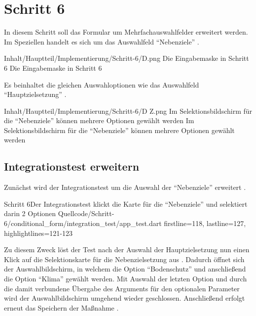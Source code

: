 \chapter{Schritt 6}
\label{chap:Schritt-6}

In diesem Schritt soll das Formular um Mehrfachauswahlfelder erweitert werden.
Im Speziellen handelt es sich um das Auswahlfeld \enquote{Nebenziele} \Abb{\ref{fig:Schritt4EingabemaskeD}}.
\begin{alexfigure}{Inhalt/Hauptteil/Implementierung/Schritt-6/D.png}
  {Die Eingabemaske in Schritt 6}
  {Die Eingabemaske in Schritt 6}

  \label{fig:Schritt4EingabemaskeD}

\end{alexfigure}


Es beinhaltet die gleichen Auswahloptionen wie das Auswahlfeld \enquote{Hauptzielsetzung} \Abb{\ref{fig:Schritt4EingabemaskeDZ}}.
\begin{alexfigure}{Inhalt/Hauptteil/Implementierung/Schritt-6/D Z.png}
  {Im Selektionsbildschirm für die \enquote{Nebenziele} können mehrere Optionen gewählt werden}
  {Im Selektionsbildschirm für die \enquote{Nebenziele} können mehrere Optionen gewählt werden}

  \label{fig:Schritt4EingabemaskeDZ}

\end{alexfigure}


\section{Integrationstest erweitern}

Zunächst wird der Integrationstest um die Auswahl der \enquote{Nebenziele} erweitert \Lst{\ref{lst:Schritt6tabSelectionCard}}.

\begin{alexlisting}{Schritt 6}{Der Integrationstest klickt die Karte für die \enquote{Nebenziele} und selektiert darin 2 Optionen}
  {Quellcode/Schritt-6/conditional_form/integration_test/app_test.dart}
  {firstline=118, lastline=127, highlightlines={121-123}}
  \label{lst:Schritt6tabSelectionCard}
\end{alexlisting}

Zu diesem Zweck löst der Test nach der Auswahl der Hauptzielsetzung  nun einen Klick auf die Selektionskarte für die Nebenzielsetzung aus .
Dadurch öffnet sich der Auswahlbildschirm,
in welchem die Option \enquote{Bodenschutz}  und anschließend die Option \enquote{Klima}  gewählt werden.
Mit Auswahl der letzten Option
und durch die damit verbundene Übergabe des Arguments  für den optionalen Parameter  wird der Auswahlbildschirm umgehend wieder geschlossen.
Anschließend erfolgt erneut das Speichern der Maßnahme .



